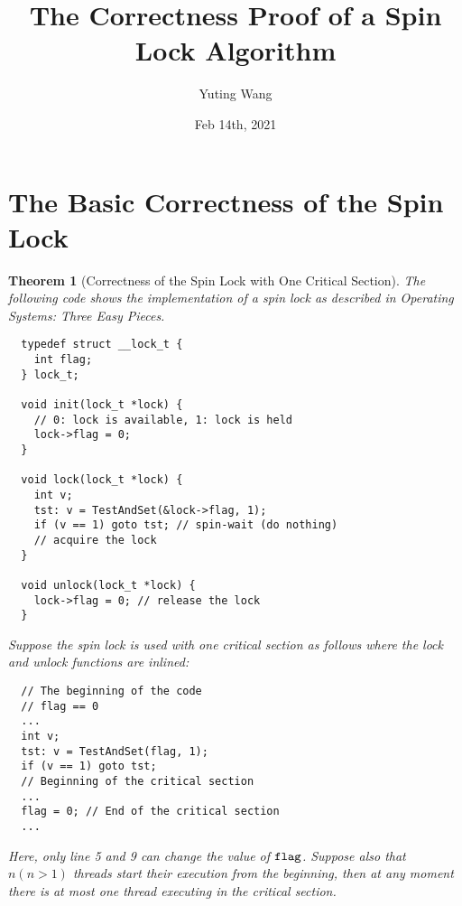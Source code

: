 \documentclass{article}[10pt]
\title{The Correctness Proof of a Spin Lock Algorithm}
\author{Yuting Wang}
\date{Feb 14th, 2021}
\newtheorem{mythm}[mydef]{Theorem}
\newcommand{\kwd}[1]{\ensuremath{\text{\ttfamily #1}}\xspace}
\def\kflag{\kwd{flag}}
\begin{document}
\maketitle

\section{The Basic Correctness of the Spin Lock}

\begin{mythm}[Correctness of the Spin Lock with One Critical Section]

The following code shows the implementation of a spin lock as
described in Operating Systems: Three Easy Pieces.
%
\begin{lstlisting}
  typedef struct __lock_t {
    int flag;
  } lock_t;

  void init(lock_t *lock) {
    // 0: lock is available, 1: lock is held
    lock->flag = 0;
  }

  void lock(lock_t *lock) {
    int v;
    tst: v = TestAndSet(&lock->flag, 1);
    if (v == 1) goto tst; // spin-wait (do nothing)
    // acquire the lock
  }

  void unlock(lock_t *lock) {
    lock->flag = 0; // release the lock
  }  
\end{lstlisting}
%
Suppose the spin lock is used with one critical section as follows
where the lock and unlock functions are inlined:
%
\begin{lstlisting}
  // The beginning of the code
  // flag == 0
  ...
  int v;
  tst: v = TestAndSet(flag, 1);
  if (v == 1) goto tst;
  // Beginning of the critical section
  ...
  flag = 0; // End of the critical section
  ...
\end{lstlisting}
%
Here, only line 5 and 9 can change the value of \kflag.
%
Suppose also that $n (n > 1)$ threads start their execution from the
beginning, then at any moment there is at most one thread executing in
the critical section.
\end{mythm}
%
\end{document}
